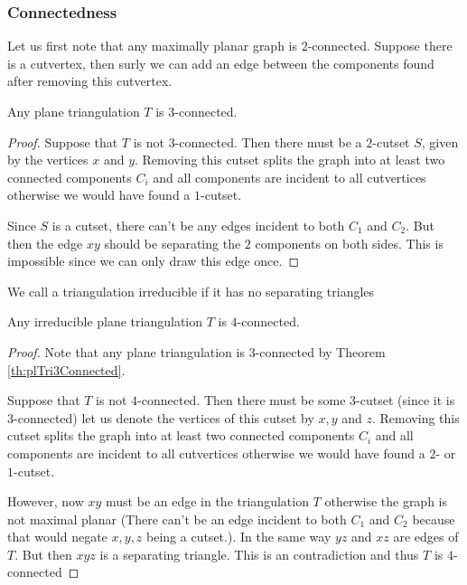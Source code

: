 \subsubsection{Connectedness}
Let us first note that any maximally planar graph is $2$-connected. Suppose there is a cutvertex, then surly we can add an edge between the components found after removing this cutvertex.
\begin{thrm}
Any plane triangulation $T$ is $3$-connected.
\label{th:plTri3Connected}
\end{thrm}

\begin{proof}
Suppose that $T$ is not $3$-connected. Then there must be a $2$-cutset $S$, given by the vertices $x$ and $y$. Removing this cutset splits the graph into at least two connected components $C_i$ and all components are incident to all cutvertices otherwise we would have found a $1$-cutset.

Since $S$ is a cutset, there can't be any edges incident to both $C_1$ and $C_2$. But then the edge $xy$ should be separating the $2$ components on both sides. This is impossible since we can only draw this edge once.
\end{proof}

\begin{defi}
We call a triangulation irreducible if it has no separating triangles
\end{defi}


\begin{thrm}
Any irreducible plane triangulation $T$ is $4$-connected.
\end{thrm}

\begin{proof}
Note that any plane triangulation is $3$-connected by Theorem \ref{th:plTri3Connected}.

Suppose that $T$ is not $4$-connected. Then there must be some $3$-cutset (since it is $3$-connected) let us denote the vertices of this cutset by $x, y$ and $z$. Removing this cutset splits the graph into at least two connected components $C_i$ and all components are incident to all cutvertices otherwise we would have found a $2$- or $1$-cutset.

However, now $xy$ must be an edge in the triangulation $T$ otherwise the graph is not maximal planar (There can't be an edge incident to both $C_1$ and $C_2$ because that would negate $x, y ,z$ being a cutset.). In the same way $yz$ and $xz$ are edges of $T$. But then $xyz$ is a separating triangle. This is an contradiction and thus $T$ is $4$-connected
\end{proof}

